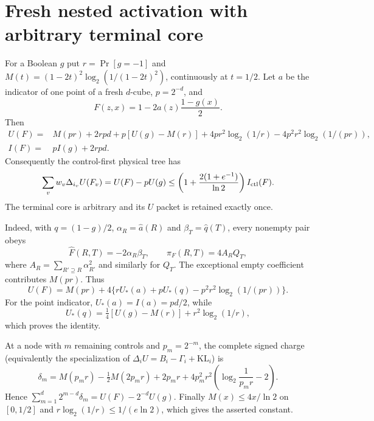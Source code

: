 \section*{Fresh nested activation with arbitrary terminal core}

For a Boolean $g$ put $r=\Pr[g=-1]$ and $M(t)=(1-2t)^2
\log_2(1/(1-2t)^2)$, continuously at $t=1/2$.  Let $a$ be the indicator of
one point of a fresh $d$-cube, $p=2^{-d}$, and
\[
 F(z,x)=1-2a(z)\frac{1-g(x)}2.
\]
Then
\[
\begin{aligned}
U(F)={}&M(pr)+2rpd+p[U(g)-M(r)]
 +4pr^2\log_2(1/r)-4p^2r^2\log_2(1/(pr)),\\
I(F)={}&pI(g)+2rpd.
\end{aligned}
\]
Consequently the control-first physical tree has
\[
 \sum_vw_v\Delta_{i_v}U(F_v)=U(F)-pU(g)
 \le \left(1+\frac{2(1+e^{-1})}{\ln2}\right)I_{\rm ctl}(F).
\]
The terminal core is arbitrary and its $U$ packet is retained exactly once.

Indeed, with $q=(1-g)/2$, $\alpha_R=\widehat a(R)$ and
$\beta_T=\widehat q(T)$, every nonempty pair obeys
\[
 \widehat F(R,T)=-2\alpha_R\beta_T,\qquad
 \pi_F(R,T)=4A_RQ_T,
\]
where $A_R=\sum_{R'\supseteq R}\alpha_{R'}^2$ and similarly for $Q_T$.
The exceptional empty coefficient contributes $M(pr)$.  Thus
\[
 U(F)=M(pr)+4\{rU_*(a)+pU_*(q)-p^2r^2\log_2(1/(pr))\}.
\]
For the point indicator, $U_*(a)=I(a)=pd/2$, while
\[
 U_*(q)=\tfrac14[U(g)-M(r)]+r^2\log_2(1/r),
\]
which proves the identity.

At a node with $m$ remaining controls and $p_m=2^{-m}$, the complete signed
charge (equivalently the specialization of
$\Delta_iU=B_i-\Gamma_i+\mathrm{KL}_i$) is
\[
 \delta_m=M(p_mr)-\tfrac12M(2p_mr)+2p_mr
 +4p_m^2r^2\left(\log_2\frac1{p_mr}-2\right).
\]
Hence $\sum_{m=1}^d2^{m-d}\delta_m=U(F)-2^{-d}U(g)$.
Finally $M(x)\le4x/\ln2$ on $[0,1/2]$ and
$r\log_2(1/r)\le1/(e\ln2)$, which gives the asserted constant.

